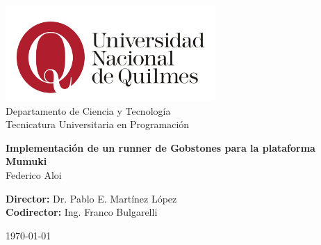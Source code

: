 \begin{titlepage}

\center

\includegraphics[width=8cm, keepaspectratio]{images/logo-unq.jpg}\\

Departamento de Ciencia y Tecnología\\
Tecnicatura Universitaria en Programación\\

\bigskip
\bigskip
\bigskip
\bigskip

{ \huge \bfseries Implementación de un runner de Gobstones para la plataforma Mumuki}\\[0.4cm] %

\Large Federico Aloi

\bigskip
\bigskip
\bigskip
\bigskip
\bigskip
\bigskip

\normalsize

\textbf{Director:} Dr. Pablo E. Martínez López\\
\textbf{Codirector:} Ing. Franco Bulgarelli

\vfill

\today

\end{titlepage}
